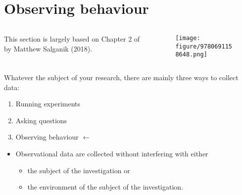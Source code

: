\documentclass[serif, aspectratio=169]{beamer}
\title{\doctitle} %
\author{
\large
\textsc{Francesco Bailo}\\[2mm] 
\normalsize The University of Sydney \\
}
\date{3 May 2018}
\begin{document}
{
\begin{frame}
  \titlepage
\end{frame}
}
\addtocounter{framenumber}{-1}

\frame{\tableofcontents}


\section{Observing behaviour}

\begin{frame}

\begin{columns}
\begin{column}{0.4\textwidth}

This section is largely based on Chapter 2 of  by Matthew Salganik (2018).

\end{column}

\begin{column}{0.6\textwidth}

\begin{figure}

\texttt{[image: figure/9780691158648.png]}

\end{figure}

\end{column}
\end{columns}

\end{frame}

\begin{frame}

Whatever the subject of your research, there are mainly three ways to collect data: 

\begin{enumerate}

\item<1-> Running experiments

\item<2-> Asking questions

\item<3-> Observing behaviour $\leftarrow$

\end{enumerate}

\begin{itemize}
\item <4-> Observational data are collected without interfering with either
\begin{itemize}
\item<4-> the subject of the investigation or 
\item<4-> the environment of the subject of the investigation.
\end{itemize}
\end{itemize}

\end{frame}
\end{document}
